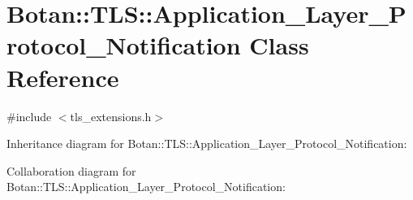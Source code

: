 \hypertarget{class_botan_1_1_t_l_s_1_1_application___layer___protocol___notification}{}\section{Botan\+:\+:T\+LS\+:\+:Application\+\_\+\+Layer\+\_\+\+Protocol\+\_\+\+Notification Class Reference}
\label{class_botan_1_1_t_l_s_1_1_application___layer___protocol___notification}


{\ttfamily \#include $<$tls\+\_\+extensions.\+h$>$}



Inheritance diagram for Botan\+:\+:T\+LS\+:\+:Application\+\_\+\+Layer\+\_\+\+Protocol\+\_\+\+Notification\+:


Collaboration diagram for Botan\+:\+:T\+LS\+:\+:Application\+\_\+\+Layer\+\_\+\+Protocol\+\_\+\+Notification\+:
